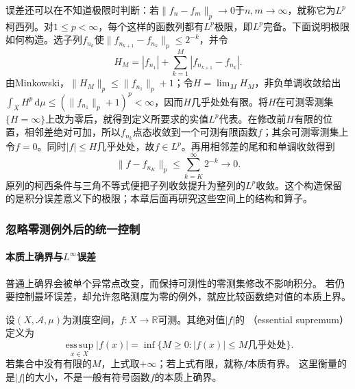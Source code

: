 误差还可以在不知道极限时判断：若$\lVert f_n-f_m\rVert_p\to0$于$n,m\to\infty$，就称它为$L^p$柯西列。对$1\leq p<\infty$，每个这样的函数列都有$L^p$极限，即$L^p$完备。下面说明极限如何构造。选子列$f_{n_k}$使$\lVert f_{n_{k+1}}-f_{n_k}\rVert_p\leq2^{-k}$，并令
\[
 H_M=|f_{n_1}|+\sum_{k=1}^M|f_{n_{k+1}}-f_{n_k}|.
\]
由Minkowski，$\lVert H_M\rVert_p\leq\lVert f_{n_1}\rVert_p+1$；令$H=\lim_M H_M$，非负单调收敛给出$\int_XH^p\,\mathrm d\mu\leq(\lVert f_{n_1}\rVert_p+1)^p<\infty$，因而$H$几乎处处有限。将$H$在可测零测集$\{H=\infty\}$上改为零后，就得到定义所要求的实值$L^p$代表。在修改前$H$有限的位置，相邻差绝对可加，所以$f_{n_k}$点态收敛到一个可测有限函数$f$；其余可测零测集上令$f=0$。同时$|f|\leq H$几乎处处，故$f\in L^p$。再用相邻差的尾和和单调收敛得到
\[
 \lVert f-f_{n_K}\rVert_p\leq\sum_{k=K}^{\infty}2^{-k}\longrightarrow0.
\]
原列的柯西条件与三角不等式便把子列收敛提升为整列的$L^p$收敛。这个构造保留的是积分误差意义下的极限；本章后面再研究这些空间上的结构和算子。

\subsubsection{忽略零测例外后的统一控制}
\paragraph{本质上确界与$L^\infty$误差}

普通上确界会被单个异常点改变，而保持可测性的零测集修改不影响积分。
若仍要控制最坏误差，却允许忽略测度为零的例外，就应比较函数绝对值的本质上界。
\begin{definition}[本质有界与绝对值的本质上界]
\label{def:analysis-essential-bound}
设$(X,\mathcal A,\mu)$为测度空间，$f:X\to\mathbb R$可测。其绝对值$|f|$的
（essential supremum）定义为
\[   \operatorname*{ess\,sup}_{x\in X}|f(x)|   =   \inf\{M\geq0:|f(x)|\leq M\text{几乎处处}\}. \]
若集合中没有有限的$M$，上式取$+\infty$；若上式有限，就称$f$本质有界。
这里衡量的是$|f|$的大小，不是一般有符号函数$f$的本质上确界。
\end{definition}

